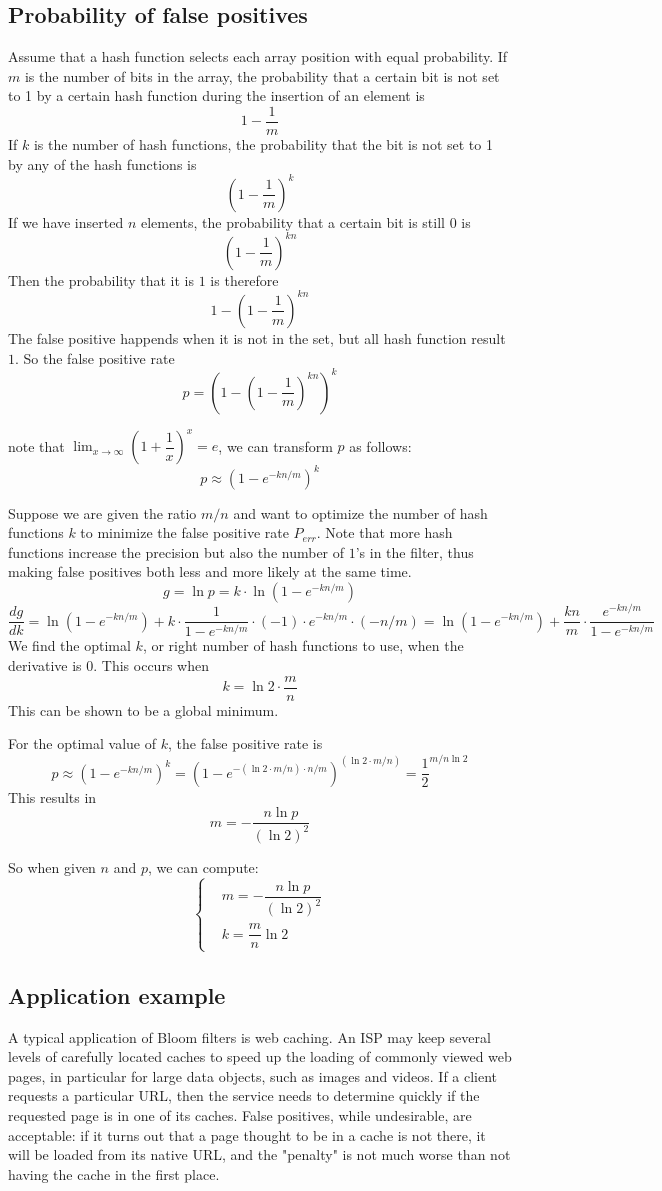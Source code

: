 \subsection{Probability of false positives}
Assume that a hash function selects each array position with equal probability.
If $m$ is the number of bits in the array, the probability that a certain bit is not set to 1 by a certain hash function during the insertion of an element is $$1 - \dfrac{1}{m}$$
If $k$ is the number of hash functions, the probability that the bit is not set to 1 by any of the hash functions is $$(1 - \dfrac{1}{m})^k$$
If we have inserted $n$ elements, the probability that a certain bit is still $0$ is $$(1 - \dfrac{1}{m})^{kn}$$
Then the probability that it is $1$ is therefore $$1 - (1 - \dfrac{1}{m})^{kn}$$
The false positive happends when it is not in the set, but all hash function result $1$. So the false positive rate $$p = (1 - (1 - \dfrac{1}{m})^{kn})^k$$

note that $\lim_{x \to \infty}(1 + \dfrac{1}{x})^x = e$, we can transform $p$ as follows:
$$p \approx (1 - e^{-kn/m})^k$$

Suppose we are given the ratio $m/n$ and want to optimize the number of hash functions $k$ to minimize the false positive rate $P_{err}$.
Note that more hash functions increase the precision but also the number of $1$’s in the filter, thus making false positives both less and more likely at the same time.
$$g = \ln p = k \cdot \ln (1 - e^{-kn/m})$$
$$
\dfrac{dg}{dk}
= \ln (1 - e^{-kn/m}) + k \cdot \dfrac{1}{1 - e^{-kn/m}} \cdot (-1) \cdot e^{-kn/m}\cdot (-n/m)
= \ln (1 - e^{-kn/m}) + \dfrac{kn}{m} \cdot \dfrac{e^{-kn/m}}{1 - e^{-kn/m}}
$$
We find the optimal $k$, or right number of hash functions to use, when the derivative is $0$.
This occurs when $$k = \ln 2 \cdot \dfrac{m}{n}$$
This can be shown to be a global minimum.

For the optimal value of $k$, the false positive rate is
$$
p
\approx (1 - e^{-kn/m})^k
= (1 - e^{- (\ln 2 \cdot m/n) \cdot n/m})^{(\ln 2 \cdot m/n)}
= \dfrac{1}{2}^{m/n \ln 2}
$$
This results in $$m = - \dfrac{n \ln p}{(\ln 2)^2}$$

So when given $n$ and $p$, we can compute:
$$
\left\{
\begin{aligned}
	& m = - \dfrac{n \ln p}{(\ln 2)^2} \\
	& k = \dfrac{m}{n} \ln 2
\end{aligned}
\right.
$$

\subsection{Application example}
A typical application of Bloom filters is web caching.
An ISP may keep several levels of carefully located caches to speed up the loading of commonly viewed web pages, in particular for large data objects, such as images and videos.
If a client requests a particular URL, then the service needs to determine quickly if the requested page is in one of its caches.
False positives, while undesirable, are acceptable: if it turns out that a page thought to be in a cache is not there, it will be loaded from its native URL,
and the "penalty" is not much worse than not having the cache in the first place.

